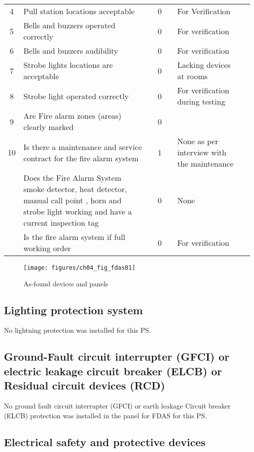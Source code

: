 \begin{table}[!h]
{\begin{tabular}{c|p{5cm}|c|c|c|p{4cm}|p{1cm}}
		4 & Pull station locations acceptable &  & 0 &  & For Verification &  \\ 
		5 & Bells and buzzers operated correctly &  & 0 &  & For verification &  \\ 
		6 & Bells and buzzers audibility &  & 0 &  & For verification &  \\ 
		7 & Strobe lights locations are acceptable &  & 0 &  & Lacking devices at rooms &  \\ 
		8 & Strobe light operated correctly &  & 0 &  & For verification during testing &  \\ 
		9 & Are Fire alarm zones (areas) clearly marked &  & 0 &  &  &  \\ 
		10 & Is there a maintenance and service contract for the fire alarm system &  & 1 &  & None as per interview with the maintenance &  \\ 
		& Does the Fire Alarm System smoke detector, heat detector, manual call point , horn and strobe light working and  have a current inspection tag &  & 0 &  & None &  \\ 
		& Is the fire alarm system if full working order &  & 0 &  & For verification &  \\ 
		\hline
	\end{tabular}
		
	}
\end{table}

\begin{figure}[!htb]
	\texttt{[image: figures/ch04\_fig\_fdas01]} \\
	\caption{As-found devices and panels}
	\label{ch04_fig_fdas01} 
\end{figure}


\subsection{Lighting protection system} \label{ch04fdas02}
No lightning protection was installed for this PS.
\subsection{Ground-Fault circuit interrupter (GFCI) or electric leakage circuit breaker (ELCB) or Residual circuit devices (RCD)} \label{ch04fdas03}
No ground fault circuit interrupter (GFCI) or earth leakage Circuit breaker (ELCB) protection was installed in the panel for FDAS for this PS.
\subsection{Electrical safety and protective devices} \label{ch04fdas04}

